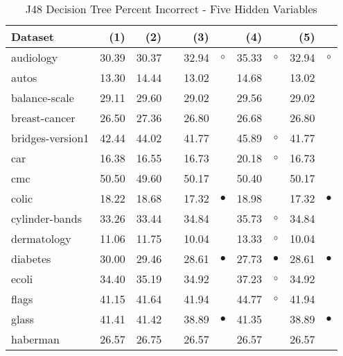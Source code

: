 \newpage
{\centering \footnotesize \begin{longtable}{lrr@{\hspace{0.1cm}}cr@{\hspace{0.1cm}}cr@{\hspace{0.1cm}}cr@{\hspace{0.1cm}}c}
\caption{\label{j48pi5}J48 Decision Tree Percent Incorrect - Five Hidden Variables}
\\
\hline
Dataset & (1)& (2) & & (3) & & (4) & & (5) & \\
\hline
audiology & 30.39 & 30.37 &          & 32.94 &   $\circ$ & 35.33 &   $\circ$ & 32.94 &   $\circ$\\
autos & 13.30 & 14.44 &          & 13.02 &           & 14.68 &           & 13.02 &          \\
balance-scale & 29.11 & 29.60 &          & 29.02 &           & 29.56 &           & 29.02 &          \\
breast-cancer & 26.50 & 27.36 &          & 26.80 &           & 26.68 &           & 26.80 &          \\
bridges-version1 & 42.44 & 44.02 &          & 41.77 &           & 45.89 &   $\circ$ & 41.77 &          \\
car & 16.38 & 16.55 &          & 16.73 &           & 20.18 &   $\circ$ & 16.73 &          \\
cmc & 50.50 & 49.60 &          & 50.17 &           & 50.40 &           & 50.17 &          \\
colic & 18.22 & 18.68 &          & 17.32 & $\bullet$ & 18.98 &           & 17.32 & $\bullet$\\
cylinder-bands & 33.26 & 33.44 &          & 34.84 &           & 35.73 &   $\circ$ & 34.84 &          \\
dermatology & 11.06 & 11.75 &          & 10.04 &           & 13.33 &   $\circ$ & 10.04 &          \\
diabetes & 30.00 & 29.46 &          & 28.61 & $\bullet$ & 27.73 & $\bullet$ & 28.61 & $\bullet$\\
ecoli & 34.40 & 35.19 &          & 34.92 &           & 37.23 &   $\circ$ & 34.92 &          \\
flags & 41.15 & 41.64 &          & 41.94 &           & 44.77 &   $\circ$ & 41.94 &          \\
glass & 41.41 & 41.42 &          & 38.89 & $\bullet$ & 41.35 &           & 38.89 & $\bullet$\\
haberman & 26.57 & 26.75 &          & 26.57 &           & 26.57 &           & 26.57 &          \\

\end{longtable}}
